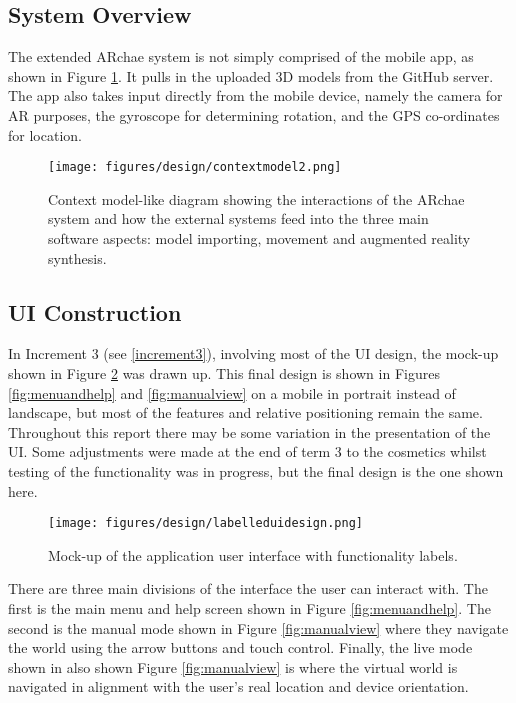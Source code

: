 \documentclass[12pt, a4paper]{article}
\begin{document}
\subsection{System Overview}
The extended ARchae system is not simply comprised of the mobile app, as shown in Figure \ref{fig:systemoverview}. It pulls in the uploaded 3D models from the GitHub server. The app also takes input directly from the mobile device, namely the camera for AR purposes, the gyroscope for determining rotation, and the GPS co-ordinates for location.

\begin{figure}[h!]
    \centering
    \texttt{[image: figures/design/contextmodel2.png]}
        \caption{Context model-like diagram showing the interactions of the ARchae system and how the external systems feed into the three main software aspects: model importing, movement and augmented reality synthesis.}
        \label{fig:systemoverview}
\end{figure}


\newpage
\subsection{UI Construction}
\label{uidesign}
In Increment 3 (see \ref{increment3}), involving most of the UI design, the mock-up shown in Figure \ref{fig:uimockup} was drawn up. This final design is shown in Figures \ref{fig:menuandhelp} and \ref{fig:manualview} on a mobile in portrait instead of landscape, but most of the features and relative positioning remain the same. Throughout this report there may be some variation in the presentation of the UI. Some adjustments were made at the end of term 3 to the cosmetics whilst testing of the functionality was in progress, but the final design is the one shown here. 

\begin{figure}[h]
    \centering
    \texttt{[image: figures/design/labelleduidesign.png]}
        \caption{Mock-up of the application user interface with functionality labels.}
        \label{fig:uimockup}
\end{figure}

There are three main divisions of the interface the user can interact with. The first is the main menu and help screen shown in Figure \ref{fig:menuandhelp}. The second is the manual mode shown in Figure \ref{fig:manualview} where they navigate the world using the arrow buttons and touch control. Finally, the live mode shown in also shown Figure \ref{fig:manualview} is where the virtual world is navigated in alignment with the user's real location and device orientation.
\end{document}

